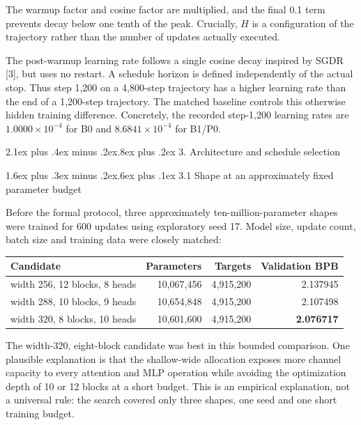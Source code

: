 \documentclass[11pt]{article}
\makeatletter
\renewcommand\section{\@startsection{section}{1}{0pt}%
  {2.1ex plus .4ex minus .2ex}{.8ex plus .2ex}%
  {\normalfont\large\bfseries}}
\renewcommand\subsection{\@startsection{subsection}{2}{0pt}%
  {1.6ex plus .3ex minus .2ex}{.6ex plus .1ex}%
  {\normalfont\normalsize\bfseries}}
\makeatother
\begin{document}
The warmup factor and cosine factor are multiplied, and the final 0.1
term prevents decay below one tenth of the peak. Crucially, \(H\) is a
configuration of the trajectory rather than the number of updates
actually executed.

The post-warmup learning rate follows a single cosine decay inspired by
SGDR {[}3{]}, but uses no restart. A schedule horizon is defined
independently of the actual stop. Thus step 1,200 on a 4,800-step
trajectory has a higher learning rate than the end of a 1,200-step
trajectory. The matched baseline controls this otherwise hidden training
difference. Concretely, the recorded step-1,200 learning rates are
\(1.0000\times10^{-4}\) for B0 and \(8.6841\times10^{-4}\) for B1/P0.

\section{3. Architecture and schedule
selection}\label{3-architecture-and-schedule-selection}

\subsection{3.1 Shape at an approximately fixed parameter
budget}\label{31-shape-at-an-approximately-fixed-parameter-budget}

Before the formal protocol, three approximately ten-million-parameter
shapes were trained for 600 updates using exploratory seed 17. Model
size, update count, batch size and training data were closely matched:

\begin{longtable}[]{@{}lrrr@{}}
\toprule\noalign{}
Candidate & Parameters & Targets & Validation BPB \\
\midrule\noalign{}
\endhead
\bottomrule\noalign{}
\endlastfoot
width 256, 12 blocks, 8 heads & 10,067,456 & 4,915,200 & 2.137945 \\
width 288, 10 blocks, 9 heads & 10,654,848 & 4,915,200 & 2.107498 \\
width 320, 8 blocks, 10 heads & 10,601,600 & 4,915,200 &
\textbf{2.076717} \\
\end{longtable}

The width-320, eight-block candidate was best in this bounded
comparison. One plausible explanation is that the shallow-wide
allocation exposes more channel capacity to every attention and MLP
operation while avoiding the optimization depth of 10 or 12 blocks at a
short budget. This is an empirical explanation, not a universal rule:
the search covered only three shapes, one seed and one short training
budget.
\end{document}
